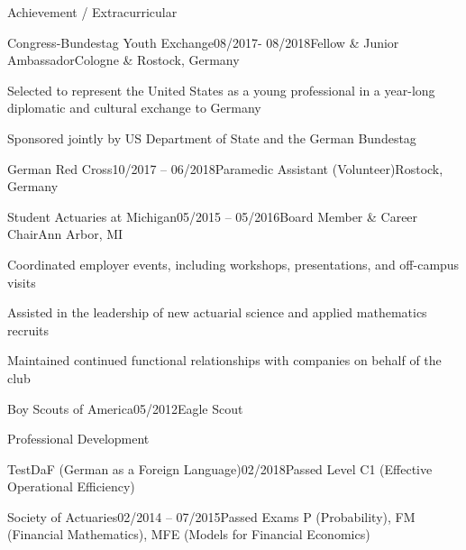 \documentclass{resume}
\begin{document}
    \begin{cvSection}{Achievement / Extracurricular}

        \begin{cvSubsection}{Congress-Bundestag Youth Exchange}{08/2017- 08/2018}{Fellow \& Junior Ambassador}{Cologne \& Rostock, Germany}
            \item Selected to represent the United States as a young professional in a year-long diplomatic
            and cultural exchange to Germany
            \item Sponsored jointly by US Department of State and the German Bundestag
        \end{cvSubsection}

        \begin{cvSubsection}{German Red Cross}{10/2017 -- 06/2018}{Paramedic Assistant (Volunteer)}{Rostock, Germany}
        \end{cvSubsection}

        \begin{cvSubsection}{Student Actuaries at Michigan}{05/2015 -- 05/2016}{Board Member \& Career Chair}{Ann Arbor, MI}
            \item Coordinated employer events, including workshops, presentations, and off-campus visits
            \item Assisted in the leadership of new actuarial science and applied mathematics recruits
            \item Maintained continued functional relationships with companies on behalf of the club
        \end{cvSubsection}

        \begin{cvSubsection}{Boy Scouts of America}{05/2012}{Eagle Scout}{}
        \end{cvSubsection}

    \end {cvSection}

    \begin{cvSection}{Professional Development }

        \begin{cvSubsection}{TestDaF (German as a Foreign Language)}{02/2018}{Passed Level C1 (Effective Operational Efficiency)}{}
        \end{cvSubsection}

        \begin{cvSubsection}{Society of Actuaries}{02/2014 -- 07/2015}{Passed Exams P (Probability), FM (Financial Mathematics), MFE (Models for Financial Economics)}{}
        \end{cvSubsection}

    \end {cvSection}
\end{document}
